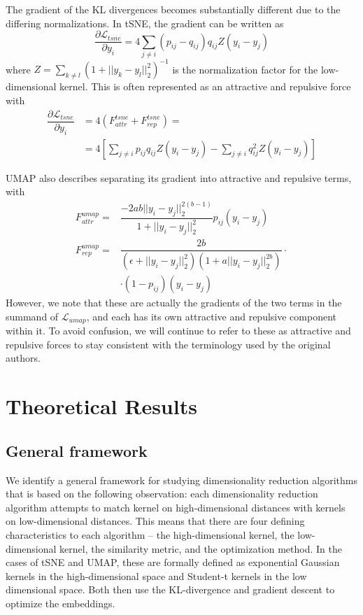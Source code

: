 \documentclass{article}
\theoremstyle{definition}
\begin{document}
\begin{multicols}{2}
The gradient of the KL divergences becomes substantially different due to the differing normalizations. In tSNE, the gradient can be written as
\begin{equation}
    \dfrac{\partial \mathcal{L}_{tsne}}{\partial y_i} = 4 \sum_{j \neq i} (p_{ij} - q_{ij}) q_{ij} Z (y_i - y_j)
\end{equation}
where $Z = \sum_{k \neq l} (1 + ||y_k - y_l||_2^2)^{-1}$ is the normalization factor for the low-dimensional kernel. This is often represented as an attractive
and repulsive force with
\begin{align*}
    \dfrac{\partial \mathcal{L}_{tsne}}{\partial y_i} &= 4(F^{tsne}_{attr} + F^{tsne}_{rep}) = \\
    &= 4 \left[ \sum_{j \neq i} p_{ij}q_{ij}Z (y_i - y_j) - \sum_{j \neq i} q_{ij}^2
Z (y_i - y_j) \right]
\end{align*}

UMAP also describes separating its gradient into attractive and repulsive terms, with
\begin{align}
    F_{attr}^{umap} = &\dfrac{-2ab||y_i - y_j||_2^{2(b-1)}}{1 + ||y_i - y_j||_2^2} p_{ij} (y_i - y_j) \\
    F_{rep}^{umap} = &\dfrac{2b}{(\epsilon + ||y_i - y_j||_2^2)(1 + a ||y_i - y_j||_2^{2b})} \cdot \\
    &\cdot (1 - p_{ij}) (y_i - y_j) \label{umap_rep}
\end{align}
However, we note that these are actually the gradients of the two terms in the summand of $\mathcal{L}_{umap}$, and each has its own attractive and repulsive
component within it. To avoid confusion, we will continue to refer to these as attractive and repulsive forces to stay consistent with the terminology used by
the original authors.

\section{Theoretical Results}
\subsection{General framework}
We identify a general framework for studying dimensionality reduction algorithms that is based on the following observation: each dimensionality reduction
algorithm attempts to match kernel on high-dimensional distances with kernels on low-dimensional distances. This means that there are four defining
characteristics to each algorithm -- the high-dimensional kernel, the low-dimensional kernel, the similarity metric, and the optimization method. In the cases of tSNE and UMAP, these
are formally defined as exponential Gaussian kernels in the high-dimensional space and Student-t kernels in the low dimensional space. Both then use the
KL-divergence and gradient descent to optimize the embeddings.


\end{multicols}
\end{document}
